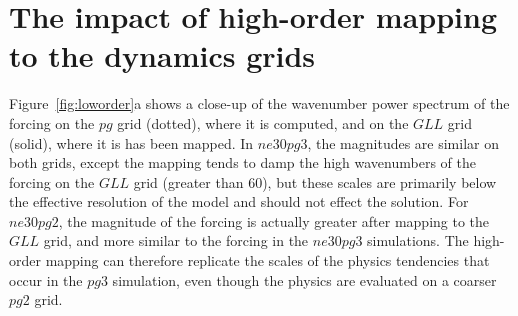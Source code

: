 \documentclass[draft,linenumbers]{agujournal}
\begin{document}
\section{The impact of high-order mapping to the dynamics grids}\label{sec:app2}

Figure~\ref{fig:loworder}a shows a close-up of the wavenumber power spectrum of the forcing on the $pg$ grid (dotted), where it is computed, and on the $GLL$ grid (solid), where it is has been mapped. In $ne30pg3$, the magnitudes are similar on both grids, except the mapping tends to damp the high wavenumbers of the forcing on the $GLL$ grid (greater than 60), but these scales are primarily below the effective resolution of the model and should not effect the solution. For $ne30pg2$, the magnitude of the forcing is actually greater after mapping to the $GLL$ grid, and more similar to the forcing in the $ne30pg3$ simulations. The high-order mapping can therefore replicate the scales of the physics tendencies that occur in the $pg3$ simulation, even though the physics are evaluated on a coarser $pg2$ grid.
\end{document}

